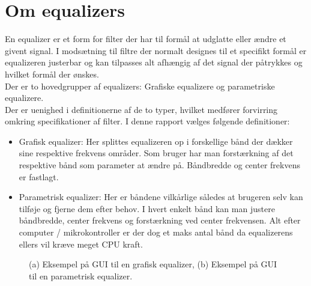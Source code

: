 \section{Om equalizers}\label{sec:equalizer}

En equalizer er et form for filter der har til formål at udglatte eller ændre et givent signal. I modsætning til filtre der normalt designes til et specifikt formål er equalizeren justerbar og kan tilpasses alt afhængig af det signal der påtrykkes og hvilket formål der ønskes.\\

Der er to hovedgrupper af equalizers: Grafiske equalizere og parametriske equalizere.\\
Der er uenighed i definitionerne af de to typer, hvilket medfører forvirring omkring specifikationer af filter. I denne rapport vælges følgende definitioner:

\begin{itemize}
	\item Grafisk equalizer: Her splittes equalizeren op i forskellige bånd der dækker sine respektive frekvens områder. Som bruger har man forstærkning af det respektive bånd som parameter at ændre på. Båndbredde og center frekvens er fastlagt.
	\item Parametrisk equalizer: Her er båndene vilkårlige således at brugeren selv kan tilføje og fjerne dem efter behov. I hvert enkelt bånd kan man justere båndbredde, center frekvens og forstærkning ved center frekvensen. Alt efter computer / mikrokontroller er der dog et maks antal bånd da equalizerens ellers vil kræve meget CPU kraft. 
\end{itemize}  


\begin{figure}[h]
	\centering
  	\caption{(a) Eksempel på GUI til en grafisk equalizer, (b) Eksempel på GUI til en parametrisk equalizer.}
	\label{fig:om_eq}
\end{figure}
\FloatBlock

